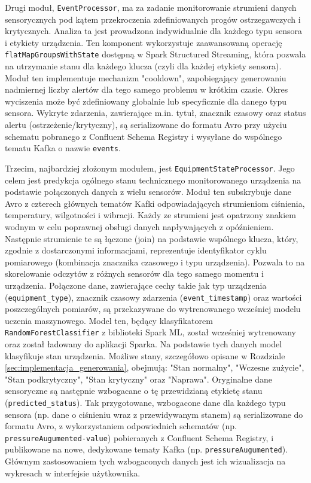 Drugi moduł, \texttt{EventProcessor}, ma za zadanie monitorowanie strumieni danych sensorycznych pod kątem przekroczenia zdefiniowanych progów ostrzegawczych i krytycznych. Analiza ta jest prowadzona indywidualnie dla każdego typu sensora i etykiety urządzenia. Ten komponent wykorzystuje zaawansowaną operację \texttt{flatMapGroupsWithState} dostępną w Spark Structured Streaming, która pozwala na utrzymanie stanu dla każdego klucza (czyli dla każdej etykiety sensora). Moduł ten implementuje mechanizm "cooldown", zapobiegający generowaniu nadmiernej liczby alertów dla tego samego problemu w krótkim czasie. Okres wyciszenia może być zdefiniowany globalnie lub specyficznie dla danego typu sensora. Wykryte zdarzenia, zawierające m.in. tytuł, znacznik czasowy oraz status alertu (ostrzeżenie/krytyczny), są serializowane do formatu Avro przy użyciu schematu pobranego z Confluent Schema Registry i wysyłane do wspólnego tematu Kafka o nazwie \texttt{events}.

Trzecim, najbardziej złożonym modułem, jest \texttt{EquipmentStateProcessor}. Jego celem jest predykcja ogólnego stanu technicznego monitorowanego urządzenia na podstawie połączonych danych z wielu sensorów. Moduł ten subskrybuje dane Avro z czterech głównych tematów Kafki odpowiadających strumieniom ciśnienia, temperatury, wilgotności i wibracji. Każdy ze strumieni jest opatrzony znakiem wodnym w celu poprawnej obsługi danych napływających z opóźnieniem. Następnie strumienie te są łączone (join) na podstawie wspólnego klucza, który, zgodnie z dostarczonymi informacjami, reprezentuje identyfikator cyklu pomiarowego (kombinacja znacznika czasowego i typu urządzenia). Pozwala to na skorelowanie odczytów z różnych sensorów dla tego samego momentu i urządzenia. Połączone dane, zawierające cechy takie jak typ urządzenia (\texttt{equipment\_type}), znacznik czasowy zdarzenia (\texttt{event\_timestamp}) oraz wartości poszczególnych pomiarów, są przekazywane do wytrenowanego wcześniej modelu uczenia maszynowego. Model ten, będący klasyfikatorem \texttt{RandomForestClassifier} z biblioteki Spark ML, został wcześniej wytrenowany oraz został ładowany do aplikacji Sparka. Na podstawie tych danych model klasyfikuje stan urządzenia. Możliwe stany, szczegółowo opisane w Rozdziale \ref{sec:implementacja_generowania}, obejmują: "Stan normalny", "Wczesne zużycie", "Stan podkrytyczny", "Stan krytyczny" oraz "Naprawa". Oryginalne dane sensoryczne są następnie wzbogacane o tę przewidzianą etykietę stanu (\texttt{predicted\_status}). Tak przygotowane, wzbogacone dane dla każdego typu sensora (np. dane o ciśnieniu wraz z przewidywanym stanem) są serializowane do formatu Avro, z wykorzystaniem odpowiednich schematów (np. \texttt{pressureAugumented-value}) pobieranych z Confluent Schema Registry, i publikowane na nowe, dedykowane tematy Kafka (np. \texttt{pressureAugumented}). Głównym zastosowaniem tych wzbogaconych danych jest ich wizualizacja na wykresach w interfejsie użytkownika.

